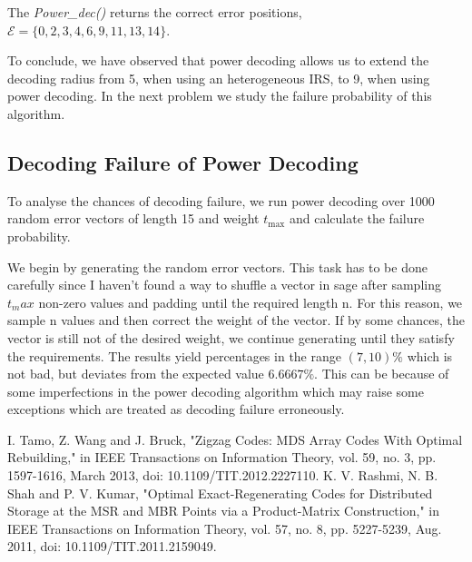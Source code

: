 \documentclass{article}
\begin{document}
The \textit{Power\_dec()} returns the correct error positions,  $\mathcal{E} = \{0, 2, 3, 4, 6, 9, 11, 13, 14\}$.

To conclude, we have observed that power decoding allows us to extend the decoding radius from 5, when using an heterogeneous IRS, to 9, when using power decoding. In the next problem we study the failure probability of this algorithm.

\subsection*{Decoding Failure of Power Decoding}
To analyse the chances of decoding failure, we run power decoding over 1000 random error vectors of length 15 and weight $t_{\text{max}}$ and calculate the failure probability.

We begin by generating the random error vectors. This task has to be done carefully since I haven't found a way to shuffle a vector in sage after sampling $t_max $ non-zero values and padding until the required length n. For this reason, we sample n values and then correct the weight of the vector. If by some chances, the vector is still not of the desired weight, we continue generating until they satisfy the requirements. The results yield percentages in the range $(7,10)\%$ which is not bad, but deviates from the expected value $6.6667\%$. This can be because of some imperfections in the power decoding algorithm which may raise some exceptions which are treated as decoding failure erroneously.

\newpage
\begin{thebibliography}{1}
I. Tamo, Z. Wang and J. Bruck, "Zigzag Codes: MDS Array Codes With Optimal Rebuilding," in IEEE Transactions on Information Theory, vol. 59, no. 3, pp. 1597-1616, March 2013, doi: 10.1109/TIT.2012.2227110.
%
K. V. Rashmi, N. B. Shah and P. V. Kumar, "Optimal Exact-Regenerating Codes for Distributed Storage at the MSR and MBR Points via a Product-Matrix Construction," in IEEE Transactions on Information Theory, vol. 57, no. 8, pp. 5227-5239, Aug. 2011, doi: 10.1109/TIT.2011.2159049.

\end{thebibliography}
\end{document}
